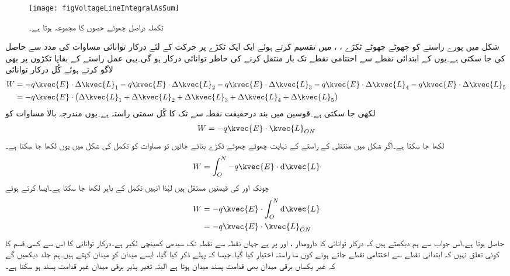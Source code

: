 \begin{figure}
\centering
\texttt{[image: figVoltageLineIntegralAsSum]}
\caption{تکملہ دراصل چھوٹے حصوں کا مجموعہ ہوتا ہے۔}
\label{شکل_دباو_تکملہ_بمع_مجموعہ}
\end{figure}
شکل  میں پورے راستے کو چھوٹے چھوٹے  ٹکڑے ، ،  میں تقسیم  کرتے ہوئے ایک ایک ٹکڑے پر حرکت کے لئے درکار توانائی مساوات  کی مدد سے  حاصل کی جا سکتی ہے۔یوں    کے ابتدائی نقطے سے اختتامی نقطے تک بار  منتقل کرنے کی
 خاطر  توانائی درکار ہو گی۔یہی عمل راستے کے بقایا ٹکڑوں پر بھی لاگو کرتے ہوئے کُل درکار توانائی
\begin{gather}
\begin{aligned}\label{مساوات_دباو_مجموعہ_ٹکڑے}
W&=-q \kvec{E} \cdot \Delta \kvec{L}_1 -q \kvec{E} \cdot \Delta \kvec{L}_2 -q \kvec{E} \cdot \Delta \kvec{L}_3 -q \kvec{E} \cdot \Delta \kvec{L}_4 -q \kvec{E} \cdot \Delta \kvec{L}_5\\
&=-q \kvec{E} \cdot \left(\Delta \kvec{L}_1  +\Delta \kvec{L}_2 +\Delta \kvec{L}_3+\Delta \kvec{L}_4+\Delta \kvec{L}_5\right)
\end{aligned}
\end{gather}
لکھی جا سکتی ہے۔قوسین میں بند  درحقیقت نقطہ  سے  تک کا  کُل سمتی راستہ  ہے۔یوں مندرجہ بالا مساوات کو
\begin{align}
W=-q \kvec{E} \cdot \kvec{L}_{ON}
\end{align}
لکھا جا سکتا ہے۔اگر شکل  میں منتقلی کے راستے کے نہایت چھوٹے چھوٹے ٹکڑے  بنائے جائیں تو مساوات  کو تکمل کی شکل میں یوں لکھا جا سکتا ہے۔
\begin{align}
W=\int_O^N -q \kvec{E} \cdot \dif \kvec{L}
\end{align}
چونکہ  اور  کی قیمتیں مستقل ہیں  لہٰذا انہیں تکمل کے باہر لکھا جا سکتا ہے۔ایسا کرتے ہوئے
\begin{gather}
\begin{aligned}\label{مساوات_توانائی_یکساں_میدان_توانائی_راستے_پر_منحصر_نہیں}
W&=-q \kvec{E} \cdot  \int_O^N \dif \kvec{L}\\
&=-q \kvec{E} \cdot \kvec{L}_{ON}
\end{aligned}
\end{gather}
حاصل ہوتا ہے۔اس جواب سے ہم دیکھتے ہیں کہ درکار توانائی کا دارومدار ،  اور  پر ہے جہاں  نقطہ  سے نقطہ  تک سیدھی کھینچی لکیر ہے۔درکار توانائی کا اس سے کسی قسم کا کوئی تعلق نہیں کہ ابتدائی نقطے سے اختتامی نقطے جاتے ہوئے کون سا راستہ اختیار کیا گیا۔جیسا کہ پہلے ذکر کیا گیا، ایسے میدان کو  میدان کہتے ہیں۔ہم جلد دیکھیں گے کہ غیر یکساں برقی میدان بھی قدامت پسند میدان ہوتا ہے البتہ تغیر پذیر  برقی میدان غیر قدامت پسند ہو سکتا ہے۔

